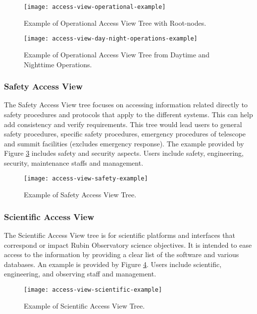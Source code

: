 \begin{figure}[ht]
\centering
\texttt{[image: access-view-operational-example]}
\caption{Example of Operational Access View Tree with Root-nodes.}
\label{fig:access-view-operational-example}
\end{figure}

\begin{figure}[ht]
\centering
\texttt{[image: access-view-day-night-operations-example]}
\caption{Example of Operational Access View Tree from Daytime and Nighttime Operations.}
\label{fig:access-view-day-night-operations-example}
\end{figure}

\subsubsection{Safety Access View}

The Safety Access View tree focuses on accessing information related directly to safety procedures and protocols that apply to the different systems.
This can help add consistency and verify requirements.
This tree would lead users to general safety procedures, specific safety procedures, emergency procedures of telescope and summit facilities (excludes emergency response).
The example provided by Figure \ref{fig:access-view-safety-example} includes safety and security aspects.
Users include safety, engineering, security, maintenance staffs and management.

\begin{figure}[ht]
\centering
\texttt{[image: access-view-safety-example]}
\caption{Example of Safety Access View Tree.}
\label{fig:access-view-safety-example}
\end{figure}

\subsubsection{Scientific Access View}

The Scientific Access View tree is for scientific platforms and interfaces that correspond or impact Rubin Observatory science objectives.
It is intended to ease access to the information by providing a clear list of the software and various databases.
An example is provided by Figure \ref{fig:access-view-scientific-example}.
Users include scientific, engineering, and observing staff and management.

\begin{figure}[ht]
\centering
\texttt{[image: access-view-scientific-example]}
\caption{Example of Scientific Access View Tree.}
\label{fig:access-view-scientific-example}
\end{figure}

